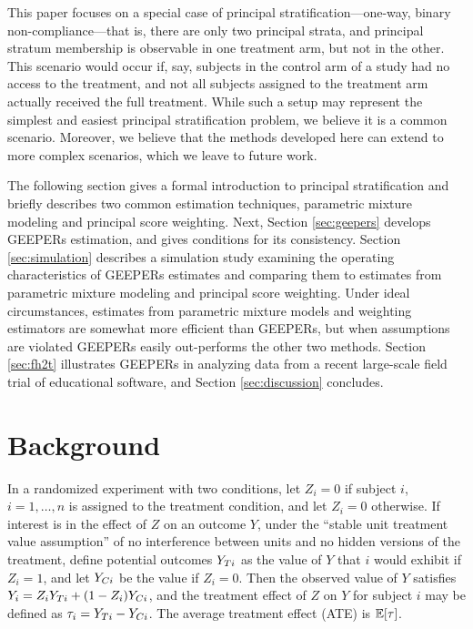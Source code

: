 \documentclass{statsoc} %
\begin{document}
This paper focuses on a special case of principal stratification---one-way, binary non-compliance---that is, there are only two principal strata, and principal stratum membership is observable in one treatment arm, but not in the other.
This scenario would occur if, say, subjects in the control arm of a study had no access to the treatment, and not all subjects assigned to the treatment arm actually received the full treatment.
While such a setup may represent the simplest and easiest principal stratification problem, we believe it is a common scenario.
Moreover, we believe that the methods developed here can extend to more complex scenarios, which we leave to future work.

The following section gives a formal introduction to principal stratification and briefly describes two common estimation techniques, parametric mixture modeling and principal score weighting.
Next, Section \ref{sec:geepers} develops GEEPERs estimation, and gives conditions for its consistency.
Section \ref{sec:simulation} describes a simulation study examining the operating characteristics of GEEPERs estimates and comparing them to estimates from parametric mixture modeling and principal score weighting.
Under ideal circumstances, estimates from parametric mixture models and weighting estimators are somewhat more efficient than GEEPERs, but when assumptions are violated GEEPERs easily out-performs the other two methods.
Section \ref{sec:fh2t} illustrates GEEPERs in analyzing data from a recent large-scale field trial of educational software, and Section \ref{sec:discussion} concludes.



\section{Background}
In a randomized experiment with two conditions, let $Z_i=0$ if subject $i$, $i=1,\dots,n$ is assigned to the treatment condition, and let $Z_i=0$ otherwise.
If interest is in the effect of $Z$ on an outcome $Y$, under the ``stable unit treatment value assumption'' \citep{air} of no interference between units and no hidden versions of the treatment, define potential outcomes \citep{splawa1990application} $Y_{Ti}$ as the value of $Y$ that $i$ would exhibit if $Z_i=1$, and let $Y_{Ci}$ be the value if $Z_i=0$. Then the observed value of $Y$ satisfies $Y_i=Z_iY_{Ti}+(1-Z_i)Y_{Ci}$, and the treatment effect of $Z$ on $Y$ for subject $i$ may be defined as $\tau_i=Y_{Ti}-Y_{Ci}$. The average treatment effect (ATE) is $\mathbb{E}[\tau]$. %
\end{document}
